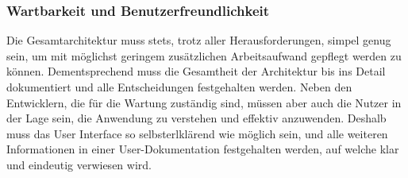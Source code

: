\subsubsection{Wartbarkeit und Benutzerfreundlichkeit}
Die Gesamtarchitektur muss stets, trotz aller Herausforderungen, simpel genug sein, um mit möglichst geringem zusätzlichen Arbeitsaufwand gepflegt werden zu können.
Dementsprechend muss die Gesamtheit der Architektur bis ins Detail dokumentiert und alle Entscheidungen festgehalten werden. Neben den Entwicklern, die für die Wartung zuständig sind, 
müssen aber auch die Nutzer in der Lage sein, die Anwendung zu verstehen und effektiv anzuwenden. Deshalb muss das User Interface so selbsterlklärend wie möglich sein, und alle weiteren Informationen 
in einer User-Dokumentation festgehalten werden, auf welche klar und eindeutig verwiesen wird. 
 

